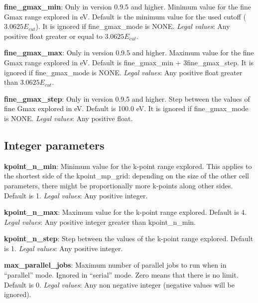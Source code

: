 \documentclass[10pt]{article}
\begin{document}
\textbf{fine\_gmax\_min}: Only in version 0.9.5 and higher. Minimum value for the fine Gmax range explored in eV. Default 
is the minimum value for the used cutoff ($3.0625E_{cut}$). It is ignored if fine\_gmax\_mode is NONE.\newline
\textit{Legal values}: Any positive float greater or equal to $3.0625E_{cut}$.\newline

\textbf{fine\_gmax\_max}: Only in version 0.9.5 and higher. Maximum value for the fine Gmax range explored in eV. Default 
is fine\_gmax\_min + 3fine\_gmax\_step. It is ignored if fine\_gmax\_mode is NONE.\newline
\textit{Legal values}: Any positive float greater than $3.0625E_{cut}$.\newline

\textbf{fine\_gmax\_step}: Only in version 0.9.5 and higher. Step between the values of fine Gmax explored in 
eV. Default is 100.0 eV. It is ignored if fine\_gmax\_mode is NONE.\newline
\textit{Legal values}: Any positive float.\newline

\subsection{Integer parameters}

\textbf{kpoint\_n\_min}: Minimum value for the k-point range explored. This 
applies to the shortest side of the kpoint\_mp\_grid: depending on the size of 
the other cell parameters, there might be proportionally more k-points along 
other sides. Default is 1.\newline
\textit{Legal values}: Any positive integer.\newline

\textbf{kpoint\_n\_max}: Maximum value for the k-point range explored. Default 
is 4.\newline
\textit{Legal values}: Any positive integer greater than kpoint\_n\_min.\newline

\textbf{kpoint\_n\_step}: Step between the values of the k-point range explored. 
Default is 1.\newline
\textit{Legal values}: Any positive integer.\newline

\textbf{max\_parallel\_jobs}: Maximum number of parallel jobs to run when in 
``parallel'' mode. Ignored in ``serial'' mode. Zero means that there is no 
limit. Default is 0.\newline
\textit{Legal values}: Any non negative integer (negative values will be 
ignored).\newline
\end{document}
